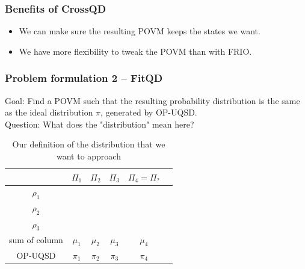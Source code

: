 \documentclass{beamer}
\begin{document}
\begin{frame}
    \frametitle{Benefits of CrossQD}
    \begin{itemize}
        \item We can make sure the resulting POVM keeps the states we want.
        \item We have more flexibility to tweak the POVM than with FRIO.
    \end{itemize}
\end{frame}

%     

\begin{frame}
    \frametitle{Problem formulation 2 -- FitQD}
    Goal: Find a POVM such that the resulting probability distribution is the
    same as the ideal distribution $\pi$, generated by OP-UQSD.\\
    Question: What does the "distribution" mean here?
    \begin{table}[ht]
        \begin{tabular}{c | c | c | c | c | c}
                          & $\Pi_{1}$            & $\Pi_{2}$            & $\Pi_{3}$            & $\Pi_{4} = \Pi_{?}$   \\
            \hline
            $\rho_{1}$    & \cellcolor{green!20} & \cellcolor{red!20}   & \cellcolor{red!20}   & \cellcolor{yellow!30} \\
            $\rho_{2}$    & \cellcolor{red!20}   & \cellcolor{green!20} & \cellcolor{red!20}   & \cellcolor{yellow!30} \\
            $\rho_{3}$    & \cellcolor{red!20}   & \cellcolor{red!20}   & \cellcolor{green!20} & \cellcolor{yellow!30} \\
            \hline
            sum of column & $\mu_{1}$            & $\mu_{2}$            & $\mu_{3}$            & $\mu_{4}$             \\
            OP-UQSD       & $\pi_{1}$            & $\pi_{2}$            & $\pi_{3}$            & $\pi_{4}$
        \end{tabular}
        \caption{Our definition of the distribution that we want to approach}
    \end{table}
\end{frame}
\end{document}
